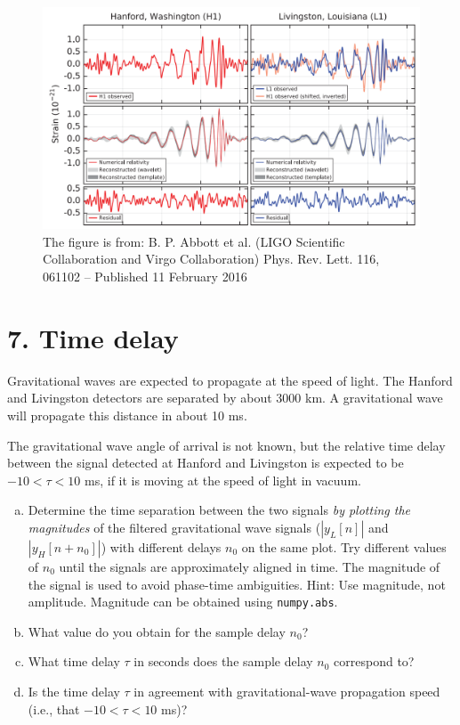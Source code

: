 \begin{figure}
  \begin{center}
    \includegraphics[width=\textwidth]{Assignments/figures/dc_fg.png}
  \end{center}
  \caption{The figure is from: B. P. Abbott et al. (LIGO Scientific Collaboration and Virgo Collaboration)
    Phys. Rev. Lett. 116, 061102 – Published 11 February 2016}
  \label{fig:ligo_result_plot}
\end{figure}


\section{7. Time delay}

Gravitational waves are expected to propagate at the speed of
light. The Hanford and Livingston detectors are separated by about
3000 km. A gravitational wave will propagate this distance in about 10 ms.

The gravitational wave angle of arrival is not known, but the relative
time delay between the signal detected at Hanford and Livingston is
expected to be $-10 < \tau < 10$ ms, if it is moving at the speed of
light in vacuum.
\begin{enumerate}[a)]

  \item Determine the time separation between the two signals \emph{by plotting the magnitudes}
        of the filtered gravitational wave signals ($|y_L[n]|$ and $|y_H[n+n_0]|$) with
        different delays $n_0$ on the same plot. Try different values of $n_0$ until the
        signals are approximately aligned in time. The magnitude of the signal is used to
        avoid phase-time ambiguities. Hint: Use magnitude, not amplitude.
        Magnitude can be obtained using \verb|numpy.abs|.

  \item What value do you obtain for the sample delay $n_0$?

  \item What time delay $\tau$ in seconds does the sample delay $n_0$ correspond to?

  \item Is the time delay $\tau$ in agreement with gravitational-wave
        propagation speed (i.e., that $-10 < \tau < 10$ ms)?

\end{enumerate}

